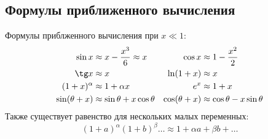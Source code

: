 \subsection{Формулы приближенного вычисления}
Формулы приблженного вычисления при $x \ll 1$:
\begin{align*}
\sin x &\approx x - \frac{x^3}{6} \approx x & \cos x &\approx 1 - \frac{x^2}{2} \\
\tg x &\approx x & \ln(1+x) &\approx x \\
(1 + x)^\alpha &\approx 1 + \alpha x & e^x &\approx 1 + x \\
\sin (\theta + x) &\approx \sin \theta + x \cos \theta & \cos(\theta + x) &\approx \cos \theta - x \sin \theta
\end{align*}
Также существует равенство для нескольких малых переменных:
\begin{equation*}
(1 + a)^\alpha (1 + b)^\beta \ldots \approx 1 + \alpha a + \beta b + \ldots
\end{equation*}